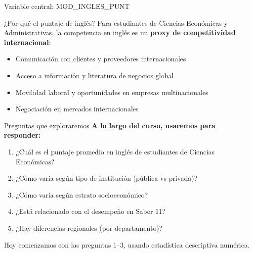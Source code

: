 \documentclass[aspectratio=169, 11pt]{beamer}
\begin{document}
\begin{frame}{Variable central: MOD\_INGLES\_PUNT}
\begin{exampleblock}{¿Por qué el puntaje de inglés?}
Para estudiantes de Ciencias Econ\'omicas y Administrativas, la competencia en inglés es un \textbf{proxy de competitividad internacional}:
\begin{itemize}
\item Comunicación con clientes y proveedores internacionales
\item Acceso a información y literatura de negocios global
\item Movilidad laboral y oportunidades en empresas multinacionales
\item Negociación en mercados internacionales
\end{itemize}
\end{exampleblock}
\end{frame}

\begin{frame}{Preguntas que exploraremos}
\textbf{A lo largo del curso, usaremos  para responder:}

\begin{enumerate}
\item ¿Cuál es el puntaje promedio en inglés de estudiantes de Ciencias Econ\'omicas?
\item ¿Cómo varía según tipo de institución (pública vs privada)?
\item ¿Cómo varía según estrato socioeconómico?
\item ¿Está relacionado con el desempeño en Saber 11?
\item ¿Hay diferencias regionales (por departamento)?
\end{enumerate}

\vspace{1em}
\alert{Hoy comenzamos con las preguntas 1--3, usando estadística descriptiva numérica.}
\end{frame}
\end{document}
